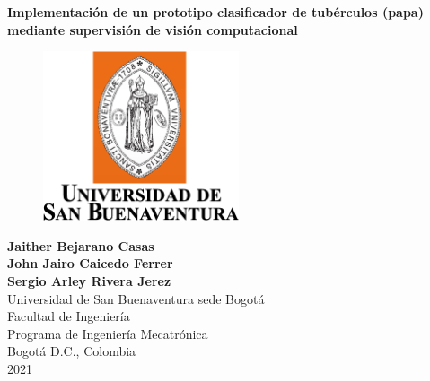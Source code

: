 \cleardoublepage

\thispagestyle{empty} 
\begin{center}
\textbf{ 
\huge{Implementación de un prototipo clasificador de tubérculos (papa) mediante supervisión de visión computacional}}\\[1.0cm]


\begin{figure}[htbp]
	\centering
		\includegraphics[height=5cm,keepaspectratio]{OtrosTex/LogoUSB}
\end{figure}

\vspace*{2cm} 
\Large\textbf{Jaither Bejarano Casas \\ John Jairo Caicedo Ferrer \\Sergio Arley Rivera Jerez}\\[1.0cm]

\vspace*{2cm} 
\Large{Universidad de San Buenaventura sede Bogotá}\\
\Large{Facultad de Ingeniería}\\
\Large{Programa de Ingeniería Mecatrónica}\\
\large{Bogotá D.C., Colombia\\
2021}\\
\end{center}

\newpage{\pagestyle{empty}\cleardoublepage}
\newpage
%
